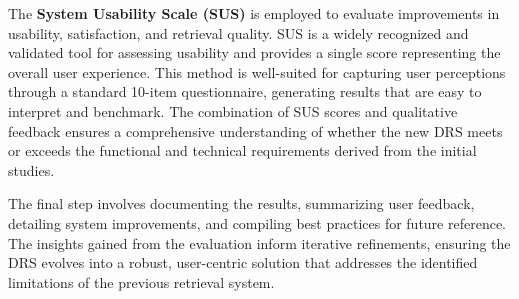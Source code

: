 \noindent The \textbf{System Usability Scale (SUS)} is employed to evaluate improvements in usability, satisfaction, and retrieval quality. SUS is a widely recognized and validated tool for assessing usability and provides a single score representing the overall user experience. This method is well-suited for capturing user perceptions through a standard 10-item questionnaire, generating results that are easy to interpret and benchmark. The combination of SUS scores and qualitative feedback ensures a comprehensive understanding of whether the new DRS meets or exceeds the functional and technical requirements derived from the initial studies.

\noindent The final step involves documenting the results, summarizing user feedback, detailing system improvements, and compiling best practices for future reference. The insights gained from the evaluation inform iterative refinements, ensuring the DRS evolves into a robust, user-centric solution that addresses the identified limitations of the previous retrieval system.
